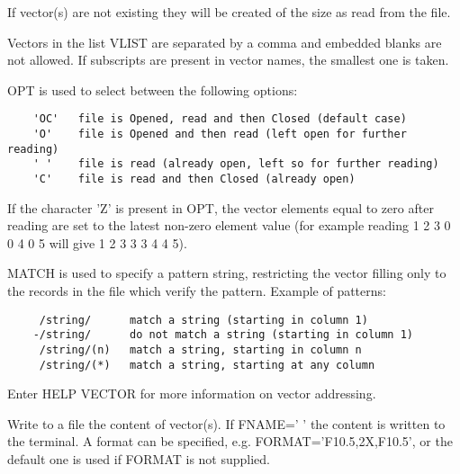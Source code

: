    \par
If vector(s) are not existing they will be created of the size as read from 
   the file.  

   \par
Vectors in the list VLIST are separated by a comma and embedded blanks are 
   not allowed. If subscripts are present in vector names, the smallest one is 
   taken.  

   \par
OPT is used to select between the following options:  
\begin{verbatim}
    'OC'   file is Opened, read and then Closed (default case)
    'O'    file is Opened and then read (left open for further reading)
    ' '    file is read (already open, left so for further reading)
    'C'    file is read and then Closed (already open)
\end{verbatim}
   \par
If the character 'Z' is present in OPT, the vector elements equal to zero 
   after reading are set to the latest non-zero element value (for example 
   reading 1 2 3 0 0 4 0 5 will give 1 2 3 3 3 4 4 5).  

   \par
MATCH is used to specify a pattern string, restricting the vector filling 
   only to the records in the file which verify the pattern. Example of 
   patterns:  
\begin{verbatim}
     /string/      match a string (starting in column 1)
    -/string/      do not match a string (starting in column 1)
     /string/(n)   match a string, starting in column n
     /string/(*)   match a string, starting at any column
\end{verbatim}
   \par
Enter HELP VECTOR for more information on vector addressing.  

\ENDCMD


\BEGARG
{}
\ENDARG
{}
\DEFOPT{\EMPTY}{}
\ENDOPT

   \par
Write to a file the content of vector(s).  If FNAME=' ' the content is 
   written to the terminal.  A format can be specified, e.g. 
   FORMAT='F10.5,2X,F10.5', or the default one is used if FORMAT is not 
   supplied.  

